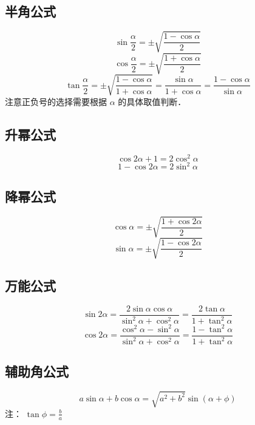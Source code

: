 \subsection{半角公式}
\begin{equation}
\sin\frac{\alpha}{2} = \pm\sqrt{\frac{1-\cos\alpha}{2}}
\end{equation}
\begin{equation}
\cos\frac{\alpha}{2}= \pm\sqrt{\frac{1+\cos\alpha}{2}}
\end{equation}
\begin{equation}
\tan\frac{\alpha}{2} = \pm\sqrt{\frac{1-\cos\alpha}{1+\cos\alpha}} = \frac{\sin\alpha}{1+\cos\alpha} = \frac{1-\cos\alpha}{\sin\alpha}
\end{equation}
注意正负号的选择需要根据 $\alpha$ 的具体取值判断．

\subsection{升幂公式}
\begin{equation}
\cos2\alpha + 1 = 2\cos^2\alpha
\end{equation}
\begin{equation}
1-\cos2\alpha = 2\sin^2\alpha
\end{equation}

\subsection{降幂公式}
\begin{equation}
\cos\alpha = \pm\sqrt{\frac{1+\cos2\alpha}{2}}
\end{equation}
\begin{equation}
\sin\alpha = \pm\sqrt{\frac{1-\cos2\alpha}{2}}
\end{equation}

\subsection{万能公式}
\begin{equation}
\sin2\alpha = \frac{2\sin\alpha \cos\alpha}{\sin^2\alpha + \cos^2\alpha} = \frac{2\tan\alpha}{1+\tan^2\alpha}
\end{equation}
\begin{equation}
\cos2\alpha = \frac{\cos^2\alpha-\sin^2\alpha}{\sin^2\alpha+\cos^2\alpha} = \frac{1-\tan^2\alpha}{1+\tan^2\alpha}
\end{equation}

\subsection{辅助角公式}
\begin{equation}
a\sin\alpha + b\cos\alpha = \sqrt{a^2+b^2}\sin(\alpha + \phi)
\end{equation}
注： $\tan\phi = \frac{b}{a}$

